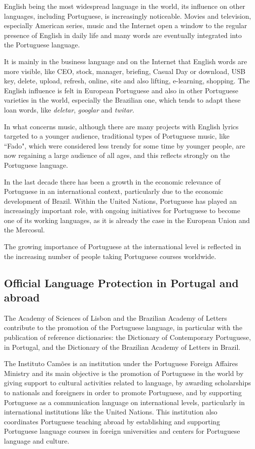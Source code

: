 \documentclass[]{../metanetpaper}
\begin{document}
\begin{multicols}{2}
   English being the most widespread language in the world, its influence on other languages, including Portuguese, is increasingly noticeable. Movies and television, especially American series, music and the Internet open a window to the regular presence of English in daily life and many words are eventually integrated into the Portuguese language.

It is mainly in the business language and on the Internet that English words are more visible, like CEO, stock, manager, briefing, Casual Day or download, USB key, delete, upload, refresh, online, site and also lifting, e-learning, shopping. The English influence is felt in European Portuguese and also in other Portuguese varieties in the world, especially the Brazilian one, which tends to adapt these loan words, like \textit{deletar}, \textit{googlar} and \textit{twitar}.

In what concerns music, although there are many projects with English lyrics targeted to a younger audience, traditional types of Portuguese music, like “Fado", which were considered less trendy for some time by younger people, are now regaining a large audience of all ages, and this reflects strongly on the Portuguese language.

  In the last decade there has been a growth in the economic relevance of Portuguese in an international context, particularly due to the economic development of Brazil. Within the United Nations, Portuguese has played an increasingly important role, with ongoing initiatives for Portuguese to become one of its working languages, as it is already the case in the European Union and the Mercosul.

The growing importance of Portuguese at the international level is reflected in the increasing number of people taking Portuguese courses worldwide.

\subsection{Official Language Protection in Portugal and abroad}

The Academy of Sciences of Lisbon and the Brazilian Academy of Letters contribute to the promotion of the Portuguese language, in particular with the publication of reference dictionaries: the Dictionary of Contemporary Portuguese, in Portugal, and the Dictionary of the Brazilian Academy of Letters in Brazil. 

The Instituto Camões is an institution under the Portuguese Foreign Affaires Ministry and its main objective is the promotion of Portuguese in the world by giving support to cultural activities related to language, by awarding scholarships to nationals and foreigners in order to promote Portuguese, and by supporting Portuguese as a communication language on international levels, particularly in international institutions like the United Nations. This institution also coordinates Portuguese teaching abroad by establishing and supporting Portuguese language courses in foreign universities and centers for Portuguese language and culture.


\end{multicols}
\end{document}
